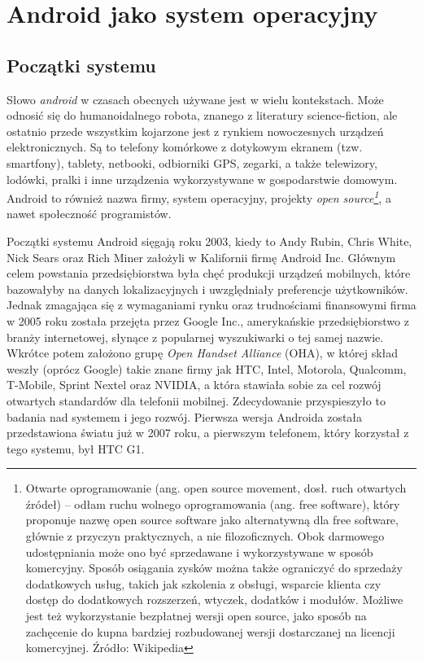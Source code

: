 \chapter{Android jako system operacyjny}

\section{Początki systemu}
Słowo \textit{android} w czasach obecnych używane jest w wielu kontekstach. Może odnosić się do humanoidalnego robota, znanego z literatury science-fiction, ale ostatnio przede wszystkim kojarzone jest z rynkiem nowoczesnych urządzeń elektronicznych. Są to telefony komórkowe z dotykowym ekranem (tzw. smartfony), tablety, netbooki, odbiorniki GPS, zegarki, a także telewizory, lodówki, pralki i inne urządzenia wykorzystywane w gospodarstwie domowym. Android to również nazwa firmy, system operacyjny, projekty \textit{open source\footnote{Otwarte oprogramowanie (ang. open source movement, dosł. ruch otwartych źródeł) – odłam ruchu wolnego oprogramowania (ang. free software), który proponuje nazwę open source software jako alternatywną dla free software, głównie z przyczyn praktycznych, a nie filozoficznych. Obok darmowego udostępniania może ono być sprzedawane i wykorzystywane w sposób komercyjny. Sposób osiągania zysków można także ograniczyć do sprzedaży dodatkowych usług, takich jak szkolenia z obsługi, wsparcie klienta czy dostęp do dodatkowych rozszerzeń, wtyczek, dodatków i modułów. Możliwe jest też wykorzystanie bezpłatnej wersji open source, jako sposób na zachęcenie do kupna bardziej rozbudowanej wersji dostarczanej na licencji komercyjnej. Źródło: Wikipedia}}, a nawet społeczność programistów.

Początki systemu Android sięgają roku 2003, kiedy to Andy Rubin, Chris White, Nick Sears oraz Rich Miner założyli w Kalifornii firmę Android Inc. Głównym celem powstania przedsiębiorstwa była chęć produkcji urządzeń mobilnych, które bazowałyby na danych lokalizacyjnych i uwzględniały preferencje użytkowników. Jednak zmagająca się z wymaganiami rynku oraz trudnościami finansowymi firma w 2005 roku została przejęta przez Google Inc., amerykańskie przedsiębiorstwo z branży internetowej, słynące z popularnej wyszukiwarki o tej samej nazwie. Wkrótce potem założono grupę \textit{Open Handset Alliance} (OHA), w której skład weszły (oprócz Google) takie znane firmy jak HTC, Intel, Motorola, Qualcomm, T-Mobile, Sprint Nextel oraz NVIDIA, a która stawiała sobie za cel rozwój otwartych standardów dla telefonii mobilnej. Zdecydowanie przyspieszyło to badania nad systemem i jego rozwój. Pierwsza wersja Androida została przedstawiona światu już w 2007 roku, a pierwszym telefonem, który korzystał z tego systemu, był HTC G1.

